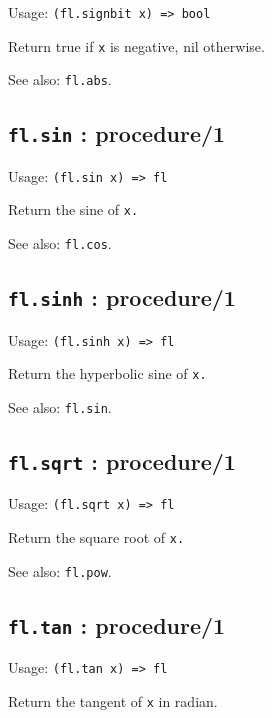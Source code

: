 \documentclass[
]{article}
\newcommand{\passthrough}[1]{#1}
\begin{document}
Usage: \passthrough{\lstinline!(fl.signbit x) => bool!}

Return true if \passthrough{\lstinline!x!} is negative, nil otherwise.

See also: \passthrough{\lstinline!fl.abs!}.

\hypertarget{fl.sin-procedure1-1}{%
\subsection{\texorpdfstring{\texttt{fl.sin} :
procedure/1}{fl.sin : procedure/1}}\label{fl.sin-procedure1-1}}

Usage: \passthrough{\lstinline!(fl.sin x) => fl!}

Return the sine of \passthrough{\lstinline!x.!}

See also: \passthrough{\lstinline!fl.cos!}.

\hypertarget{fl.sinh-procedure1-1}{%
\subsection{\texorpdfstring{\texttt{fl.sinh} :
procedure/1}{fl.sinh : procedure/1}}\label{fl.sinh-procedure1-1}}

Usage: \passthrough{\lstinline!(fl.sinh x) => fl!}

Return the hyperbolic sine of \passthrough{\lstinline!x.!}

See also: \passthrough{\lstinline!fl.sin!}.

\hypertarget{fl.sqrt-procedure1-1}{%
\subsection{\texorpdfstring{\texttt{fl.sqrt} :
procedure/1}{fl.sqrt : procedure/1}}\label{fl.sqrt-procedure1-1}}

Usage: \passthrough{\lstinline!(fl.sqrt x) => fl!}

Return the square root of \passthrough{\lstinline!x.!}

See also: \passthrough{\lstinline!fl.pow!}.

\hypertarget{fl.tan-procedure1-1}{%
\subsection{\texorpdfstring{\texttt{fl.tan} :
procedure/1}{fl.tan : procedure/1}}\label{fl.tan-procedure1-1}}

Usage: \passthrough{\lstinline!(fl.tan x) => fl!}

Return the tangent of \passthrough{\lstinline!x!} in radian.
\end{document}
